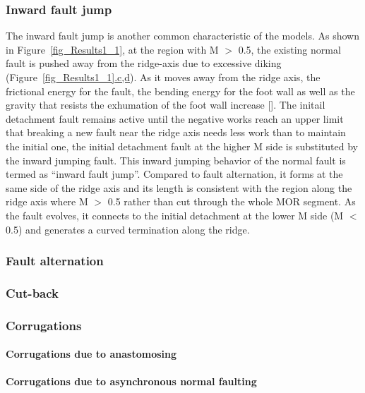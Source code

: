 \subsubsection{Inward fault jump}
The inward fault jump is another common characteristic of the models. As shown in Figure~\hyperref[fig_Results1_1]{\ref{fig_Results1_1}}, at the region with M $>$ 0.5, the existing normal fault is pushed away from the ridge-axis due to excessive diking (Figure~\hyperref[fig_Results1_1]{\ref{fig_Results1_1}.c,d}). As it moves away from the ridge axis, the frictional energy for the fault, the bending energy for the foot wall as well as the gravity that resists the exhumation of the foot wall increase [\citealp{Lavier2000, Olive2014}]. The initail detachment fault remains active until the negative works reach an upper limit that breaking a new fault near the ridge axis needs less work than to maintain the initial one, the initial detachment fault at the higher M side is substituted by the inward jumping fault. This inward jumping behavior of the normal fault is termed as ``inward fault jump''. Compared to fault alternation, it forms at the same side of the ridge axis and its length is consistent with the region along the ridge axis where M $>$ 0.5 rather than cut through the whole MOR segment. As the fault evolves, it connects to the initial detachment at the lower M side (M $<$ 0.5) and generates a curved termination along the ridge.
\subsubsection{Fault alternation}
\subsubsection{Cut-back}
\subsubsection{Corrugations}
\paragraph{Corrugations due to anastomosing}
\paragraph{Corrugations due to asynchronous normal faulting}


